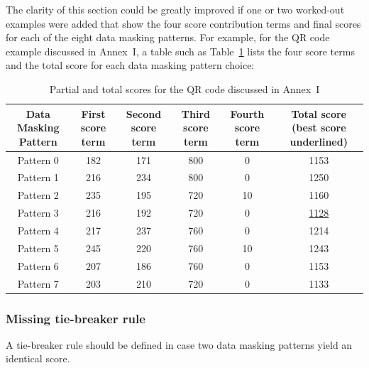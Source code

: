 \documentclass[a4paper,twoside]{article}
\newcommand{\best}[1]{\underline{#1}}
\begin{document}
The clarity of this section could be greatly improved if one or two worked-out examples were added that show the four score
contribution terms and final scores for each of the eight data masking patterns. For example, for the QR code example discussed
in Annex~I, a table such as Table~\ref{tab:dmp-selection-annex-example} lists the four score terms and the total score for each
data masking pattern choice:

\begin{table}[h!]
\centering
\tiny
\begin{tabular}{|c|c|c|c|c|c|}
\hline
Data Masking Pattern & First score term & Second score term & Third score term & Fourth score term & Total score (best score underlined) \\
\hline
Pattern 0            & 182              & 171               & 800              &  0                & 1153        \\
Pattern 1            & 216              & 234               & 800              &  0                & 1250        \\
Pattern 2            & 235              & 195               & 720              & 10                & 1160        \\
Pattern 3            & 216              & 192               & 720              &  0                & \best{1128} \\
Pattern 4            & 217              & 237               & 760              &  0                & 1214        \\
Pattern 5            & 245              & 220               & 760              & 10                & 1243        \\
Pattern 6            & 207              & 186               & 760              &  0                & 1153        \\
Pattern 7            & 203              & 210               & 720              &  0                & 1133        \\
\hline
\end{tabular}
\caption{Partial and total scores for the QR code discussed in Annex~I}
\label{tab:dmp-selection-annex-example}
\end{table}

\subsubsection*{Missing tie-breaker rule}

A tie-breaker rule should be defined in case two data masking patterns yield an identical score.
\end{document}
